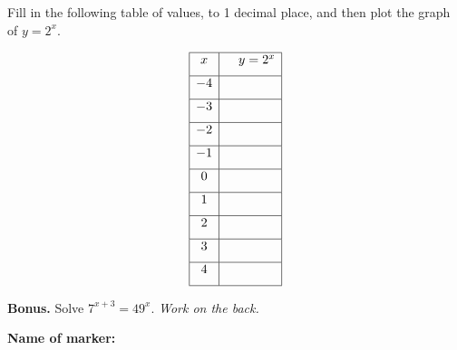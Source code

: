 \documentclass[12pt]{exam}
\begin{document}
\begin{questions}

\question[4] Fill in the following table of values, to 1 decimal place, and then plot the graph of $y = 2^x$.
\begin{minipage}[t]{0.25\textwidth}
\vspace{0mm}
\[
\begin{array}{|c|c|}
\hline
x & \quad y = 2^x \quad \\[6pt]
\hline
-4 & \\[6pt] \hline
-3 & \\[6pt] \hline
-2 & \\[6pt] \hline
-1 & \\[6pt] \hline
0 & \\[6pt] \hline
1 & \\[6pt] \hline
2 & \\[6pt] \hline
3 & \\[6pt] \hline
4 & \\[6pt] \hline
\end{array}
\] 

\end{minipage}
\hfill
\begin{minipage}[t]{0.55\textwidth}
\vspace{0mm}


\end{minipage}

\vfill

\question \textbf{Bonus.} Solve $7^{x+3} = 49^x$. \hfill \emph{Work on the back.}

\end{questions}



\begin{tcolorbox}

\textbf{Name of marker:}

\begin{center}
\gradetable[h][questions]
\end{center}

\end{tcolorbox}
\end{document}
